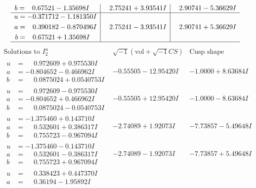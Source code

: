 \documentclass[1p]{elsarticle_modified}
\theoremstyle{definition}
\newcommand{\I}{\sqrt{-1}}
\begin{document}
$$\begin{array}{c|c|c}
\begin{aligned}
b &= \phantom{-}0.67521 - 1.35698 I\end{aligned}
 & \phantom{-}2.75241 + 3.93541 I & \phantom{-}2.90741 - 5.36629 I \\ \hline\begin{aligned}
u &= -0.371712 - 1.181350 I \\
a &= \phantom{-}0.390182 - 0.870496 I \\
b &= \phantom{-}0.67521 + 1.35698 I\end{aligned}
 & \phantom{-}2.75241 - 3.93541 I & \phantom{-}2.90741 + 5.36629 I\\
 \hline 
 \end{array}$$\newpage$$\begin{array}{c|c|c}  
\text{Solutions to }I^u_{2}& \I (\text{vol} + \sqrt{-1}CS) & \text{Cusp shape}\\
 \hline 
\begin{aligned}
u &= \phantom{-}0.972609 + 0.975530 I \\
a &= -0.804652 - 0.466962 I \\
b &= \phantom{-}0.0875024 + 0.0540753 I\end{aligned}
 & -0.55505 - 12.95420 I & -1.0000 + 8.63684 I \\ \hline\begin{aligned}
u &= \phantom{-}0.972609 - 0.975530 I \\
a &= -0.804652 + 0.466962 I \\
b &= \phantom{-}0.0875024 - 0.0540753 I\end{aligned}
 & -0.55505 + 12.95420 I & -1.0000 - 8.63684 I \\ \hline\begin{aligned}
u &= -1.375460 + 0.143710 I \\
a &= \phantom{-}0.532601 + 0.386317 I \\
b &= \phantom{-}0.755723 - 0.967094 I\end{aligned}
 & -2.74089 + 1.92073 I & -7.73857 - 5.49648 I \\ \hline\begin{aligned}
u &= -1.375460 - 0.143710 I \\
a &= \phantom{-}0.532601 - 0.386317 I \\
b &= \phantom{-}0.755723 + 0.967094 I\end{aligned}
 & -2.74089 - 1.92073 I & -7.73857 + 5.49648 I \\ \hline\begin{aligned}
u &= \phantom{-}0.338423 + 0.447370 I \\
a &= \phantom{-}0.36194 - 1.95892 I \\

\end{aligned}
\end{array}$$
\end{document}
